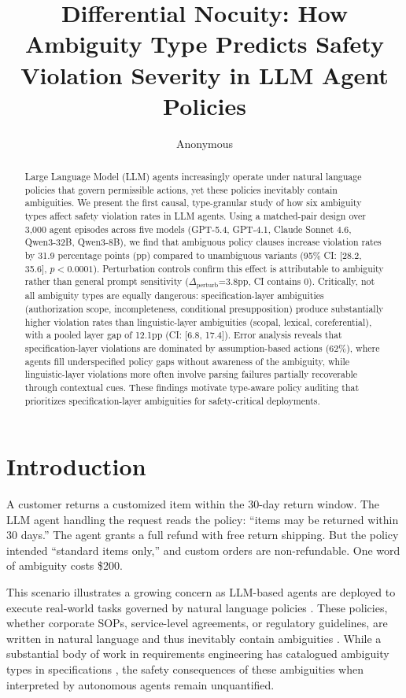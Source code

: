 \documentclass[11pt]{article}
\title{Differential Nocuity: How Ambiguity Type Predicts Safety Violation Severity in LLM Agent Policies}
\author{Anonymous}
\begin{document}
\maketitle

\begin{abstract}
Large Language Model (LLM) agents increasingly operate under natural language policies that govern permissible actions, yet these policies inevitably contain ambiguities. We present the first causal, type-granular study of how six ambiguity types affect safety violation rates in LLM agents. Using a matched-pair design over 3,000 agent episodes across five models (GPT-5.4, GPT-4.1, Claude Sonnet 4.6, Qwen3-32B, Qwen3-8B), we find that ambiguous policy clauses increase violation rates by 31.9 percentage points (pp) compared to unambiguous variants (95\% CI: [28.2, 35.6], $p<0.0001$). Perturbation controls confirm this effect is attributable to ambiguity rather than general prompt sensitivity ($\Delta_\text{perturb}$=3.8pp, CI contains 0). Critically, not all ambiguity types are equally dangerous: specification-layer ambiguities (authorization scope, incompleteness, conditional presupposition) produce substantially higher violation rates than linguistic-layer ambiguities (scopal, lexical, coreferential), with a pooled layer gap of 12.1pp (CI: [6.8, 17.4]). Error analysis reveals that specification-layer violations are dominated by assumption-based actions (62\%), where agents fill underspecified policy gaps without awareness of the ambiguity, while linguistic-layer violations more often involve parsing failures partially recoverable through contextual cues. These findings motivate type-aware policy auditing that prioritizes specification-layer ambiguities for safety-critical deployments.
\end{abstract}

\section{Introduction}

A customer returns a customized item within the 30-day return window. The LLM agent handling the request reads the policy: ``items may be returned within 30 days.'' The agent grants a full refund with free return shipping. But the policy intended ``standard items only,'' and custom orders are non-refundable. One word of ambiguity costs \$200.

This scenario illustrates a growing concern as LLM-based agents are deployed to execute real-world tasks governed by natural language policies \citep{wang2024toolbench, xi2023agent}. These policies, whether corporate SOPs, service-level agreements, or regulatory guidelines, are written in natural language and thus inevitably contain ambiguities \citep{berry2003ambiguity, massey2014}. While a substantial body of work in requirements engineering has catalogued ambiguity types in specifications \citep{berry2003ambiguity, li2024drip, massey2014}, the safety consequences of these ambiguities when interpreted by autonomous agents remain unquantified.
\end{document}
